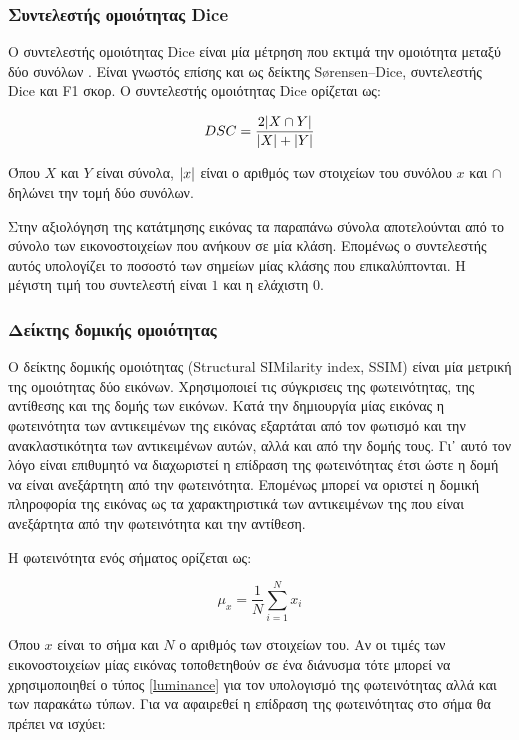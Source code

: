 \documentclass[a4paper,12pt]{article}
\DeclarePairedDelimiter\abs{\lvert}{\rvert}
\begin{document}
\subsubsection{Συντελεστής ομοιότητας Dice}

Ο συντελεστής ομοιότητας Dice είναι μία μέτρηση που εκτιμά την ομοιότητα μεταξύ
δύο συνόλων \cite{dice:1}. Είναι γνωστός επίσης και ως δείκτης Sørensen–Dice,
συντελεστής Dice και F1 σκορ. Ο συντελεστής ομοιότητας Dice ορίζεται ως:

\begin{equation*}
    DSC = \frac{2 \abs{X \cap Y}} {\abs{X} + \abs{Y}}
\end{equation*}

Όπου $X$ και $Y$ είναι σύνολα, $\abs{x}$ είναι ο αριθμός των στοιχείων του
συνόλου $x$ και $\cap$ δηλώνει την τομή δύο συνόλων.

Στην αξιολόγηση της κατάτμησης εικόνας τα παραπάνω σύνολα αποτελούνται από το
σύνολο των εικονοστοιχείων που ανήκουν σε μία κλάση. Επομένως ο συντελεστής
αυτός υπολογίζει το ποσοστό των σημείων μίας κλάσης που επικαλύπτονται. Η
μέγιστη τιμή του συντελεστή είναι $1$ και η ελάχιστη $0$.

\subsubsection{Δείκτης δομικής ομοιότητας}

Ο δείκτης δομικής ομοιότητας \cite{SSIM:1} (Structural SIMilarity index, SSIM)
είναι μία μετρική της ομοιότητας δύο εικόνων. Χρησιμοποιεί τις σύγκρισεις της
φωτεινότητας, της αντίθεσης και της δομής των εικόνων. Κατά την δημιουργία μίας
εικόνας η φωτεινότητα των αντικειμένων της εικόνας εξαρτάται από τον φωτισμό και
την ανακλαστικότητα των αντικειμένων αυτών, αλλά και από την δομής τους. Γι᾽
αυτό τον λόγο είναι επιθυμητό να διαχωριστεί η επίδραση της φωτεινότητας έτσι
ώστε η δομή να είναι ανεξάρτητη από την φωτεινότητα. Επομένως μπορεί να οριστεί
η δομική πληροφορία της εικόνας ως τα χαρακτηριστικά των αντικειμένων της που
είναι ανεξάρτητα από την φωτεινότητα και την αντίθεση.

Η φωτεινότητα ενός σήματος ορίζεται ως:

\begin{equation}\label{luminance}
    \mu_x = \frac {1} {N} \sum_{i=1}^{N} x_i
\end{equation}

Όπου $x$ είναι το σήμα  και $N$ ο αριθμός των στοιχείων του. Αν οι τιμές των
εικονοστοιχείων μίας εικόνας τοποθετηθούν σε ένα διάνυσμα τότε μπορεί να
χρησιμοποιηθεί ο τύπος \eqref{luminance} για τον υπολογισμό της φωτεινότητας
αλλά και των παρακάτω τύπων. Για να αφαιρεθεί η επίδραση της φωτεινότητας στο
σήμα θα πρέπει να ισχύει:
\end{document}
